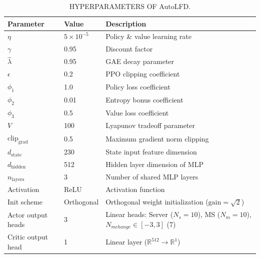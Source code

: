 \begin{table}[htbp]
\centering
\caption{HYPERPARAMETERS OF AutoLFD.}
\label{tab:autolfd_hyperparameters}
\begin{tabular}{lll}
\toprule
\textbf{Parameter} & \textbf{Value} & \textbf{Description} \\
\midrule
$\eta$ & $5 \times 10^{-5}$ & Policy \& value learning rate \\
$\gamma$ & 0.95 & Discount factor \\
$\hat{\lambda}$ & 0.95 & GAE decay parameter \\
$\epsilon$ & 0.2 & PPO clipping coefficient \\
$\phi_1$ & 1.0 & Policy loss coefficient \\
$\phi_2$ & 0.01 & Entropy bonus coefficient \\
$\phi_3$ & 0.5 & Value loss coefficient \\
$V$ & 100 & Lyapunov tradeoff parameter \\
$\text{clip}_{\text{grad}}$ & 0.5 & Maximum gradient norm clipping \\
$d_{\text{state}}$ & 230 & State input feature dimension \\
$d_{\text{hidden}}$ & 512 & Hidden layer dimension of MLP \\
$n_{\text{layers}}$ & 3 & Number of shared MLP layers \\
Activation & ReLU & Activation function \\
Init scheme & Orthogonal & Orthogonal weight initialization ($\text{gain}=\sqrt{2}$) \\
Actor output heads & 3 & Linear heads: Server ($N_s=10$), MS ($N_m=10$), $N_{mchange} \in [-3, 3]$ (7) \\
Critic output head & 1 & Linear layer ($\mathbb{R}^{512} \to \mathbb{R}^1$) \\
\bottomrule
\end{tabular}
\end{table}
